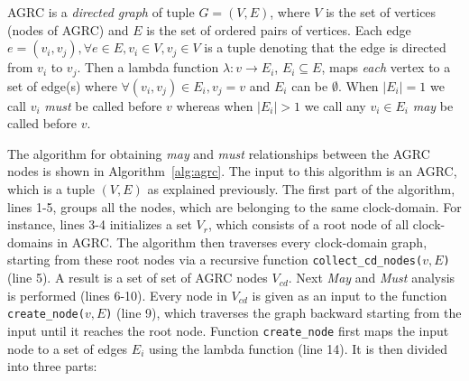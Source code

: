 AGRC is a \textit{directed graph} of tuple $G =(V,E)$, where $V$ is the
set of vertices (nodes of AGRC) and $E$ is the set of ordered pairs of
vertices. Each edge $e = (v_i,v_j), \forall e \in E, v_i \in V, v_j \in
V$ is a tuple denoting that the edge is directed from $v_i$ to $v_j$.
Then a lambda  function $\lambda:v \rightarrow E_i$, $E_i \subseteq E$,
maps \textit{each} vertex to a set of edge(s) where $\forall (v_i,v_j)
\in E_i, v_j = v$ and $E_i$ can be $\emptyset$. When $|E_i| = 1$ we call
$v_i$ \textit{must} be called before $v$ whereas when $|E_i| > 1$ we
call any $v_i \in E_i$ \textit{may} be called before $v$.

The algorithm for obtaining \textit{may} and \textit{must} relationships
between the AGRC nodes is shown in Algorithm~\ref{alg:agrc}. The input
to this algorithm is an AGRC, which is a tuple $(V,E)$ as explained
previously. The first part of the algorithm, lines 1-5, groups all the
nodes, which are belonging to the same clock-domain. For instance, lines
3-4 initializes a set $V_r$, which consists of a root node of all
clock-domains in AGRC. The algorithm then traverses every clock-domain
graph, starting from these root nodes via a recursive function
\texttt{collect\_cd\_nodes($v,E$)} (line 5). A result is a set of set of
AGRC nodes $V_{cd}$. Next \textit{May} and \textit{Must} analysis is
performed (lines 6-10). Every node in $V_{cd}$ is given as an input to
the function \texttt{create\_node($v,E$)} (line 9), which traverses the
graph backward starting from the input until it reaches the root node.
Function \texttt{create\_node} first maps the input node to a set of
edges $E_i$ using the lambda function (line 14). It is then divided into
three parts:

